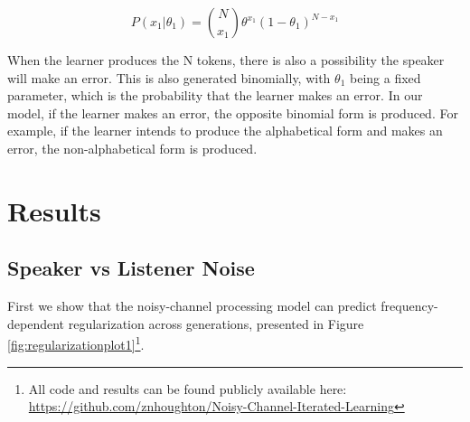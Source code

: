 \documentclass[
  jou,floatsintext]{apa6}
\begin{document}
\begin{equation}
\label{eq:binomialProd}
P(x_1|\theta_1) = \binom{N}{x_1} \theta^{x_1} (1-\theta_1)^{N-x_1}
\end{equation}

When the learner produces the N tokens, there is also a possibility the speaker will make an error. This is also generated binomially, with \(\theta_1\) being a fixed parameter, which is the probability that the learner makes an error. In our model, if the learner makes an error, the opposite binomial form is produced. For example, if the learner intends to produce the alphabetical form and makes an error, the non-alphabetical form is produced.

\section{Results}\label{results}

\subsection{Speaker vs Listener Noise}\label{speaker-vs-listener-noise}

First we show that the noisy-channel processing model can predict frequency-dependent regularization across generations, presented in Figure \ref{fig:regularizationplot1}\footnote{All code and results can be found publicly available here: \url{https://github.com/znhoughton/Noisy-Channel-Iterated-Learning}}.
\end{document}
